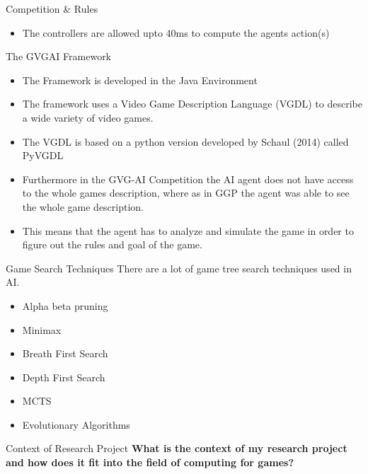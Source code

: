 \documentclass{beamer}
\begin{document}
\begin{frame}{Competition \& Rules}		
			\begin{itemize}
			
			\item The controllers are allowed upto 40ms to compute the agents action(s)  \pause

		\end{itemize}
\end{frame}


\begin{frame}{The GVGAI Framework}		
			\begin{itemize}
			\item The Framework is developed in the Java Environment \pause
			\item The framework uses a Video Game Description Language (VGDL) to describe a wide variety of video games. \pause
			\item The VGDL is based on a python version developed by Schaul (2014) called PyVGDL \pause
			\item  Furthermore in the GVG-AI Competition the AI agent does not have access to the whole games description, where as in GGP the agent was able to see the whole game description. \pause
			\item  This means that the agent has to analyze and simulate the game in order to figure out the rules and goal of the game. \pause
		\end{itemize}
\end{frame}

\begin{frame}{Game Search Techniques}
		There are a lot of game tree search techniques used in AI. 
			\begin{itemize}
			\item Alpha beta pruning \pause
			\item Minimax \pause
			\item Breath First Search \pause
			\item Depth First Search \pause
			\item MCTS \pause
			\item Evolutionary Algorithms \pause
		\end{itemize}
\end{frame}

\begin{frame}{Context of Research Project}
	\textbf{What is the context of my research project and how does it fit into the field of computing for games?}
	
	
\end{frame}
\end{document}
